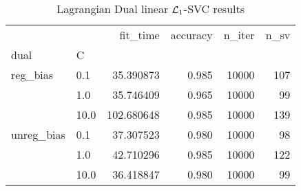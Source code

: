 \begin{table}[H]
\centering
\caption{Lagrangian Dual linear $\protect \mathcal{L}_1$-SVC results}
\label{linear_lagrangian_dual_l1_svc_cv_results}
\begin{tabular}{llrrrr}
\toprule
           &      &    fit\_time &  accuracy &  n\_iter &  n\_sv \\
dual & C &             &           &         &       \\
\midrule
reg\_bias & 0.1  &   35.390873 &     0.985 &   10000 &   107 \\
           & 1.0  &   35.746409 &     0.965 &   10000 &    99 \\
           & 10.0 &  102.680648 &     0.985 &   10000 &   139 \\
unreg\_bias & 0.1  &   37.307523 &     0.980 &   10000 &    98 \\
           & 1.0  &   42.710296 &     0.985 &   10000 &   122 \\
           & 10.0 &   36.418847 &     0.980 &   10000 &    99 \\
\bottomrule
\end{tabular}
\end{table}
